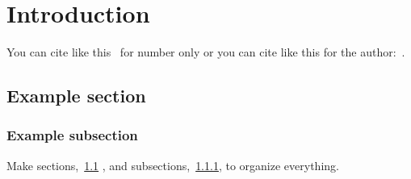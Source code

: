 \chapter{Introduction}
\label{chap:introduction}

You can cite like this~\citep{DiCarlo_2018_DynamicLocomotion} for number only or you can cite like this for the author:~\citet{DiCarlo_2018_DynamicLocomotion}.


\section{Example section}\label{sec:name}
\subsection{Example subsection}\label{subsec:name}
Make sections,~\ref{sec:name} , and subsections,~\ref{subsec:name}, to organize everything.